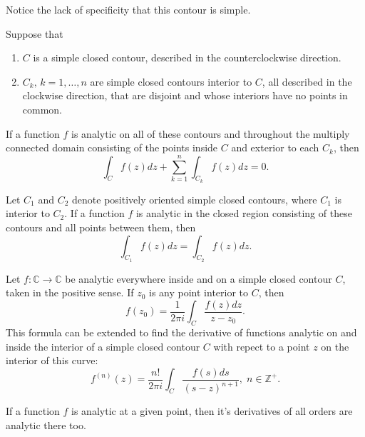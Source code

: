 \documentclass{article}
\begin{document}
\begin{remark}
	Notice the lack of specificity that this contour is simple.
\end{remark}
\begin{theorem}
	Suppose that
	\begin{enumerate}
		\item \(C\) is a simple closed contour, described in the counterclockwise direction.
		\item \(C_k,\,k=1,\ldots,n\) are simple closed contours interior to \(C\), all described in the clockwise direction, that are disjoint and whose interiors have no points in common.
	\end{enumerate}
	If a function \(f\) is analytic on all of these contours and throughout the multiply connected domain consisting of the points inside \(C\) and exterior to each \(C_k\), then
	\begin{equation*}
		\int_Cf(z)dz+\sum_{k=1}^n\int_{C_k}f(z)dz=0.
	\end{equation*}
\end{theorem}
\begin{corollary}
	Let \(C_1\) and \(C_2\) denote positively oriented simple closed contours, where \(C_1\) is interior to \(C_2\). If a function \(f\) is analytic in the closed region consisting of these contours and all points between them, then
	\begin{equation*}
		\int_{C_1}f(z)dz=\int_{C_2}f(z)dz.
	\end{equation*}
\end{corollary}
\begin{theorem}
	Let \(f:\mathbb{C}\rightarrow\mathbb{C}\) be analytic everywhere inside and on a simple closed contour \(C\), taken in the positive sense. If \(z_0\) is any point interior to \(C\), then
	\begin{equation*}
		f(z_0)=\frac{1}{2\pi i}\int_C\frac{f(z)dz}{z-z_0}.
	\end{equation*}
	This formula can be extended to find the derivative of functions analytic on and inside the interior of a simple closed contour \(C\) with repect to a point \(z\) on the interior of this curve:
	\begin{equation*}
		f^{(n)}(z)=\frac{n!}{2\pi i}\int_C\frac{f(s)ds}{(s-z)^{n+1}},\;n\in\mathbb{Z}^+.
	\end{equation*}
\end{theorem}
\begin{theorem}
	If a function \(f\) is analytic at a given point, then it's derivatives of all orders are analytic there too.
\end{theorem}
\end{document}

